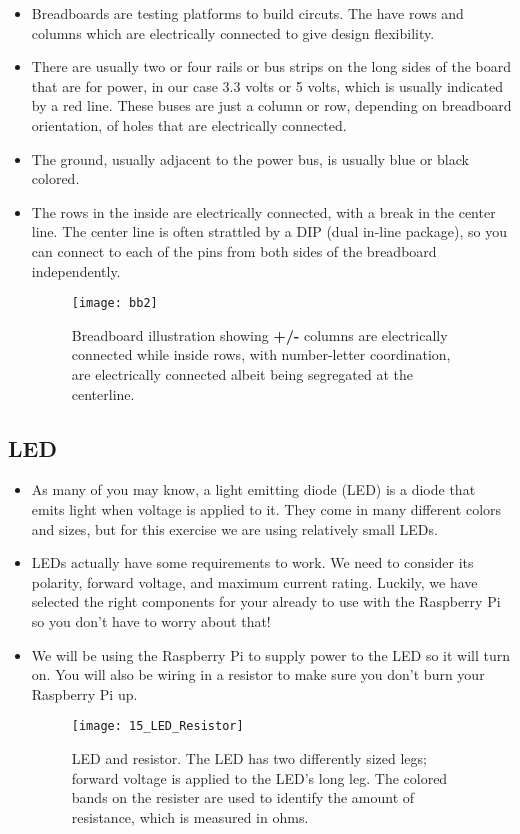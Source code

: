 \documentclass{article}\usepackage[]{graphicx}\usepackage[]{color}
\begin{document}
\begin{itemize}
\item Breadboards are testing platforms to build circuts. The have rows and columns which are electrically connected to give design flexibility. 
\item There are usually two or four rails or bus strips on the long sides of the board that are for power, in our case 3.3 volts or 5 volts, which is usually indicated by a red line. These buses are just a column or row, depending on breadboard orientation, of holes that are electrically connected. 
\item The ground, usually adjacent to the power bus, is usually blue or black colored. 
\item The rows in the inside are electrically connected, with a break in the center line. The center line is often strattled by a DIP (dual in-line package), so you can connect to each of the pins from both sides of the breadboard independently. 
\begin{figure}[h]
\begin{center}
\texttt{[image: bb2]}
\caption{Breadboard illustration showing \textbf{+/-} columns are electrically connected while inside rows, with number-letter coordination, are electrically connected albeit being segregated at the centerline.\label{fig:bb2}}
\end{center}
\end{figure}
\end{itemize}

\subsection{LED}

\begin{itemize}
\item As many of you may know, a light emitting diode (LED) is a diode that emits light when voltage is applied to it. They come in many different colors and sizes, but for this exercise we are using relatively small LEDs.
\item LEDs actually have some requirements to work. We need to consider its polarity, forward voltage, and maximum current rating. Luckily, we have selected the right components for your already to use with the Raspberry Pi so you don't have to worry about that!
\item We will be using the Raspberry Pi to supply power to the LED so it will turn on. You will also be wiring in a resistor to make sure you don't burn your Raspberry Pi up.
\begin{figure}[h]
\centering
\texttt{[image: 15\_LED\_Resistor]}
\caption{LED and resistor. The LED has two differently sized legs; forward voltage is applied to the LED's long leg. The colored bands on the resister are used to identify the amount of resistance, which is measured in ohms.\label{fig:ledres}}
\end{figure}
\end{itemize}
\end{document}
